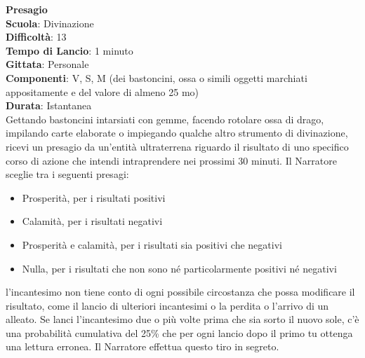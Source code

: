 \begin{multicols}{2}
\medskip\textbf{Presagio}\\
\textbf{Scuola}: Divinazione\\
\textbf{Difficoltà}:  13\\
\textbf{Tempo di Lancio}: 1 minuto\\
\textbf{Gittata}: Personale\\
\textbf{Componenti}: V, S, M (dei bastoncini, ossa o simili oggetti marchiati appositamente e del valore di almeno 25 mo)\\
\textbf{Durata}: Istantanea\\
Gettando bastoncini intarsiati con gemme, facendo rotolare ossa di drago, impilando carte elaborate o impiegando qualche altro strumento di divinazione, ricevi un presagio da un'entità ultraterrena riguardo il risultato di uno specifico corso di azione che intendi intraprendere nei prossimi 30 minuti. Il Narratore sceglie tra i seguenti presagi:
\medskip
\begin{itemize}
\item 
Prosperità, per i risultati positivi
\item 
Calamità, per i risultati negativi
\item 
Prosperità e calamità, per i risultati sia positivi che negativi
\item 
Nulla, per i risultati che non sono né particolarmente positivi né negativi
\end{itemize}
\medskip
l'incantesimo non tiene conto di ogni possibile circostanza che possa modificare il risultato, come il lancio di ulteriori incantesimi o la perdita o l’arrivo di un alleato. Se lanci l'incantesimo due o più volte prima che sia sorto il nuovo sole, c’è una probabilità cumulativa del 25\% che per ogni lancio dopo il primo tu ottenga una lettura erronea. Il Narratore effettua questo tiro in segreto.


\end{multicols}
